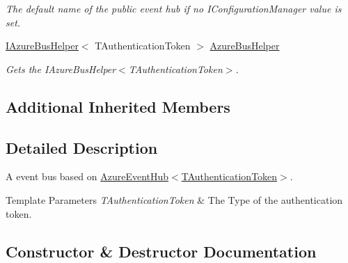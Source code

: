 \begin{DoxyCompactItemize}
\begin{DoxyCompactList}\small\item\em The default name of the public event hub if no I\+Configuration\+Manager value is set. \end{DoxyCompactList}\item 
\hyperlink{interfaceCqrs_1_1Azure_1_1ServiceBus_1_1IAzureBusHelper}{I\+Azure\+Bus\+Helper}$<$ T\+Authentication\+Token $>$ \hyperlink{classCqrs_1_1Azure_1_1ServiceBus_1_1AzureEventHubBus_ac70c513a41f42208cc3332d4ed855af8_ac70c513a41f42208cc3332d4ed855af8}{Azure\+Bus\+Helper}
\begin{DoxyCompactList}\small\item\em Gets the I\+Azure\+Bus\+Helper$<$\+T\+Authentication\+Token$>$. \end{DoxyCompactList}\end{DoxyCompactItemize}
\subsection*{Additional Inherited Members}


\subsection{Detailed Description}
A event bus based on \hyperlink{classCqrs_1_1Azure_1_1ServiceBus_1_1AzureEventHub_adef2c26639ae4a7725c397da7fd90000_adef2c26639ae4a7725c397da7fd90000}{Azure\+Event\+Hub$<$\+T\+Authentication\+Token$>$}. 


\begin{DoxyTemplParams}{Template Parameters}
{\em T\+Authentication\+Token} & The Type of the authentication token.\\
\hline
\end{DoxyTemplParams}


\subsection{Constructor \& Destructor Documentation}
\mbox{\label{classCqrs_1_1Azure_1_1ServiceBus_1_1AzureEventHubBus_aef24d23dd76d6bb0f58b582e2abf9872_aef24d23dd76d6bb0f58b582e2abf9872}} 
